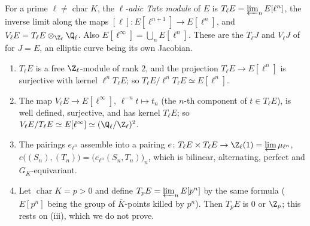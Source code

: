 \begin{definition}\label{def:ellcurves:tate}
For a prime $\ell\ne\operatorname{char}K$, the \emph{$\ell$-adic Tate module} of $E$ is $T_\ell E=\varprojlim_nE[\ell^n]$, the inverse limit along the maps
$[\ell]\colon E[\ell^{n+1}]\to E[\ell^n]$, and $V_\ell E=T_\ell E\otimes_{\Z_\ell}\Q_\ell$. Also $E[\ell^\infty]=\bigcup_nE[\ell^n]$. These are the $T_\ell J$ and $V_\ell J$ of  for
$J=E$, an elliptic curve being its own Jacobian.
\end{definition}

\begin{proposition}\label{prop:ellcurves:tate}
\leavevmode
\begin{enumerate}[label=(\roman*)]
\item $T_\ell E$ is a free $\Z_\ell$-module of rank $2$, and the projection $T_\ell E\to E[\ell^n]$ is surjective with kernel $\ell^nT_\ell E$; so $T_\ell E/\ell^nT_\ell E\simeq E[\ell^n]$.
\item The map $V_\ell E\to E[\ell^\infty]$, $\ell^{-n}t\mapsto t_n$ (the $n$-th component of $t\in T_\ell E$), is well defined, surjective, and has kernel $T_\ell E$; so
$V_\ell E/T_\ell E\simeq E[\ell^\infty]\simeq(\Q_\ell/\Z_\ell)^2$.
\item The pairings $e_{\ell^n}$ assemble into a pairing $e\colon T_\ell E\times T_\ell E\to\Z_\ell(1)=\varprojlim\mu_{\ell^n}$, $e\bigl((S_n),(T_n)\bigr)=\bigl(e_{\ell^n}(S_n,T_n)\bigr)_n$, which
is bilinear, alternating, perfect and $G_K$-equivariant.
\item Let $\operatorname{char}K=p>0$ and define $T_pE=\varprojlim_nE[p^n]$ by the same formula ($E[p^n]$ being the group of $\bar K$-points killed by $p^n$). Then
$T_pE$ is $0$ or $\Z_p$; this rests on (iii), which we do not prove.
\end{enumerate}
\end{proposition}

